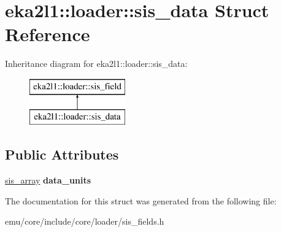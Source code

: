 \hypertarget{structeka2l1_1_1loader_1_1sis__data}{}\section{eka2l1\+:\+:loader\+:\+:sis\+\_\+data Struct Reference}
\label{structeka2l1_1_1loader_1_1sis__data}
Inheritance diagram for eka2l1\+:\+:loader\+:\+:sis\+\_\+data\+:\begin{figure}[H]
\begin{center}
\leavevmode
\includegraphics[height=2.000000cm]{structeka2l1_1_1loader_1_1sis__data}
\end{center}
\end{figure}
\subsection*{Public Attributes}
\begin{DoxyCompactItemize}
\item 
\mbox{\label{structeka2l1_1_1loader_1_1sis__data_a5debdc3d3f86ae68d7d7feee02653f70}} 
\mbox{\hyperlink{structeka2l1_1_1loader_1_1sis__array}{sis\+\_\+array}} {\bfseries data\+\_\+units}
\end{DoxyCompactItemize}


The documentation for this struct was generated from the following file\+:\begin{DoxyCompactItemize}
\item 
emu/core/include/core/loader/sis\+\_\+fields.\+h\end{DoxyCompactItemize}
